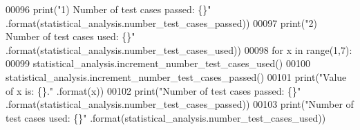 \begin{DoxyCode}
00096         print(\textcolor{stringliteral}{"1) Number of test cases passed:  \{\}"} .format(statistical\_analysis.number\_test\_cases\_passed))
00097         print(\textcolor{stringliteral}{"2) Number of test cases used:    \{\}"} .format(statistical\_analysis.number\_test\_cases\_used))
00098         \textcolor{keywordflow}{for} x \textcolor{keywordflow}{in} range(1,7):
00099             statistical\_analysis.increment\_number\_test\_cases\_used()
00100             statistical\_analysis.increment\_number\_test\_cases\_passed()
00101             print(\textcolor{stringliteral}{"Value of x is: \{\}."} .format(x))
00102             print(\textcolor{stringliteral}{"Number of test cases passed: \{\}"} .format(statistical\_analysis.number\_test\_cases\_passed))
00103             print(\textcolor{stringliteral}{"Number of test cases used:   \{\}"} .format(statistical\_analysis.number\_test\_cases\_used))
\end{DoxyCode}
